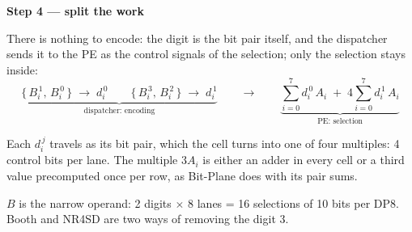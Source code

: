 \documentclass[fleqn]{article}
\begin{document}
\vspace{0.8em}

\noindent\textbf{Step 4 --- split the work}

\noindent There is nothing to encode: the digit is the bit pair itself, and the dispatcher
sends it to the PE as the control signals of the selection; only the selection stays inside:
\[
\underbrace{\bigl\{\, B_i^{\,1},\, B_i^{\,0} \,\bigr\} \;\longrightarrow\; d_i^{\,0}
  \qquad
  \bigl\{\, B_i^{\,3},\, B_i^{\,2} \,\bigr\} \;\longrightarrow\; d_i^{\,1}}_{\textstyle \text{dispatcher: encoding}}
\qquad\longrightarrow\qquad
\underbrace{\sum_{i=0}^{7} d_i^{\,0} \, A_i \;+\; 4 \sum_{i=0}^{7} d_i^{\,1} \, A_i}_{\textstyle \text{PE: selection}}
\]

\noindent Each $d_i^{\,j}$ travels as its bit pair, which the cell turns into one of four
multiples: 4 control bits per lane. The multiple $3A_i$ is either an adder in every cell or
a third value precomputed once per row, as Bit-Plane does with its pair sums.

\vspace{0.8em}

\noindent $B$ is the narrow operand: 2 digits $\times$ 8 lanes = 16 selections of
10 bits per DP8. Booth and NR4SD are two ways of removing the digit $3$.
\end{document}
